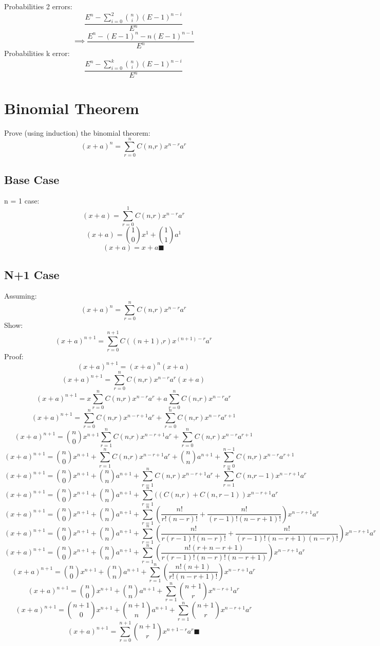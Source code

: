 \documentclass[a4paper,12pt]{article}
\begin{document}
Probabilities 2 errors: \\
\[\frac{ E^n - \sum ^2 _{i=0} \binom{n}{i}(E-1)^{n-i}} {E^n}\]
\[\implies \frac{ E^n - (E-1)^{n} - n(E-1)^{n-1} }{E^n}\]
Probabilities k error: \\
\[\frac{ E^n - \sum ^k _{i=0} \binom{n}{i}(E-1)^{n-i}} {E^n}\]
\section{Binomial Theorem}
Prove (using induction) the binomial theorem:
\[
(x+a)^n = \sum_{r=0}^n C(n‚ r)x^{n-r}a^r
\]
\subsection{Base Case}
n = 1 case:\\
\[(x+a) = \sum_{r=0}^1 C(n‚ r)x^{n-r}a^r\]
\[(x+a) = \binom{1}{0} x^{1} + \binom{1}{1}  a^1\]
\[(x+a) = x+a \blacksquare \]
\subsection{N+1 Case}
Assuming:
\[
(x+a)^n = \sum_{r=0}^n C(n‚ r)x^{n-r}a^r
\]
Show:
\[(x+a)^{n+1} = \sum_{r=0}^{n+1} C((n+1)‚ r)x^{(n+1)-r}a^r\]
Proof:
\[(x+a)^{n+1} =  (x+a)^n (x+a)\]
\[(x+a)^{n+1} =  \sum_{r=0}^n C(n‚ r)x^{n-r}a^r (x+a)\]
\[(x+a)^{n+1} =  x\sum_{r=0}^n C(n‚ r)x^{n-r}a^r + a\sum_{r=0}^n C(n‚ r)x^{n-r}a^{r}\] 
\[(x+a)^{n+1} =  \sum_{r=0}^n C(n‚ r)x^{n-r+1}a^r + \sum_{r=0}^n C(n‚ r)x^{n-r}a^{r+1}\] 
\[(x+a)^{n+1} =  \binom{n}{0} x^{n+1}\sum_{r=1}^n C(n‚ r)x^{n-r+1}a^r + \sum_{r=0}^n C(n‚ r)x^{n-r}a^{r+1}\] 
\[(x+a)^{n+1} =  \binom{n}{0} x^{n+1}+ \sum_{r=1}^n C(n‚ r)x^{n-r+1}a^r + \binom{n}{n}a^{n+1}+\sum_{r=0}^{n-1} C(n‚ r)x^{n-r}a^{r+1}\] 
\[(x+a)^{n+1} =  \binom{n}{0} x^{n+1}+\binom{n}{n}a^{n+1}+ \sum_{r=1}^n C(n‚ r)x^{n-r+1}a^r + \sum_{r=1}^{n} C(n‚ r-1)x^{n-r+1}a^{r}\] 
\[(x+a)^{n+1} =  \binom{n}{0} x^{n+1}+\binom{n}{n}a^{n+1}+ \sum_{r=1}^n ((C(n‚ r)+C(n,r-1) )x^{n-r+1}a^r\]
\[(x+a)^{n+1} =  \binom{n}{0} x^{n+1}+\binom{n}{n}a^{n+1}+ \sum_{r=1}^n (\frac{n!}{r!(n-r)!}+\frac{n!}{(r-1)!(n-r+1)!} )x^{n-r+1}a^r\]
\[(x+a)^{n+1} =  \binom{n}{0} x^{n+1}+\binom{n}{n}a^{n+1}+ \sum_{r=1}^n (\frac{n!}{r(r-1)!(n-r)!}+\frac{n!}{(r-1)!(n-r+1)(n-r)!} )x^{n-r+1}a^r\]
\[(x+a)^{n+1} =  \binom{n}{0} x^{n+1}+\binom{n}{n}a^{n+1}+ \sum_{r=1}^n (\frac{n!(r+n-r+1)}{r(r-1)!(n-r)!(n-r+1)})x^{n-r+1}a^r\]
\[(x+a)^{n+1} =  \binom{n}{0} x^{n+1}+\binom{n}{n}a^{n+1}+ \sum_{r=1}^n (\frac{n!(n+1)}{r!(n-r+1)!})x^{n-r+1}a^r\]
\[(x+a)^{n+1} =  \binom{n}{0} x^{n+1}+\binom{n}{n}a^{n+1}+ \sum_{r=1}^n \binom{n+1}{r}x^{n-r+1}a^r\]
\[(x+a)^{n+1} =  \binom{n+1}{0} x^{n+1}+\binom{n+1}{n}a^{n+1}+ \sum_{r=1}^n \binom{n+1}{r}x^{n-r+1}a^r\]
\[(x+a)^{n+1} =  \sum_{r=0}^{n+1} \binom{n+1}{r}x^{n+1-r}a^r\blacksquare\]
\end{document}
